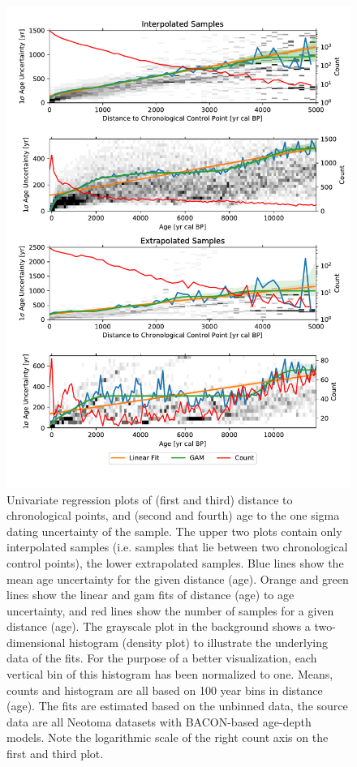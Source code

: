 \begin{refsection}
\begin{figure}
	\captionsetup{width=\linewidth}
	\includegraphics[width=\linewidth]{gridding-figures/univariate-models.pdf}
	\caption[Univariate age uncertainty models]{Univariate regression plots of (first and third) distance to chronological points, and (second and fourth) age to the one sigma dating uncertainty of the sample. The upper two plots contain only interpolated samples (i.e. samples that lie between two chronological control points), the lower extrapolated samples. Blue lines show the mean age uncertainty for the given distance (age). Orange and green lines show the linear and \gls{gam} fits of distance (age) to age uncertainty, and red lines show the number of samples for a given distance (age). The grayscale plot in the background shows a two-dimensional histogram (density plot) to illustrate the underlying data of the fits. For the purpose of a better visualization, each vertical bin of this histogram has been normalized to one. Means, counts and histogram are all based on 100 year bins in distance (age). The fits are estimated based on the unbinned data, the source data are all Neotoma datasets with BACON-based age-depth models. Note the logarithmic scale of the right count axis on the first and third plot.}
	\label{fig:gridding-univariate-age-unc}
\end{figure}


\end{refsection}
